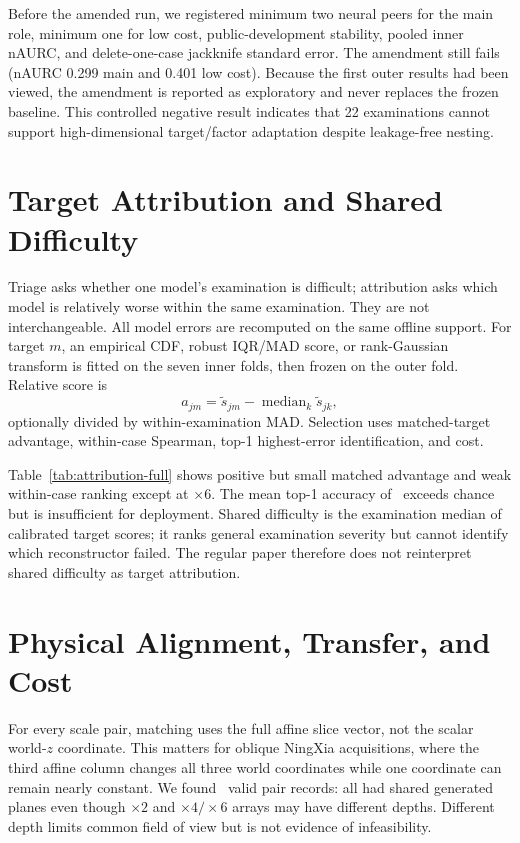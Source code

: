 \documentclass{article}
\begin{document}
Before the amended run, we registered minimum two neural peers for the main role, minimum one for low cost, public-development stability, pooled inner nAURC, and delete-one-case jackknife standard error. The amendment still fails (nAURC 0.299 main and 0.401 low cost). Because the first outer results had been viewed, the amendment is reported as exploratory and never replaces the frozen baseline. This controlled negative result indicates that 22 examinations cannot support high-dimensional target/factor adaptation despite leakage-free nesting.

\section{Target Attribution and Shared Difficulty}
Triage asks whether one model's examination is difficult; attribution asks which model is relatively worse within the same examination. They are not interchangeable. All model errors are recomputed on the same offline support. For target $m$, an empirical CDF, robust IQR/MAD score, or rank-Gaussian transform is fitted on the seven inner folds, then frozen on the outer fold. Relative score is
\begin{equation}
 a_{jm}=\widetilde s_{jm}-\operatorname{median}_{k}\widetilde s_{jk},
\end{equation}
optionally divided by within-examination MAD. Selection uses matched-target advantage, within-case Spearman, top-1 highest-error identification, and cost.

\begin{table}[!t]
 \centering
 \caption{Outer-fold attribution across all 11 neural targets. Chance top-1 accuracy is 9.1\%.}
 \resizebox{\columnwidth}{!}{}
 \label{tab:attribution-full}
\end{table}

Table~\ref{tab:attribution-full} shows positive but small matched advantage and weak within-case ranking except at $\times6$. The mean top-1 accuracy of \NestedAttrTop\ exceeds chance but is insufficient for deployment. Shared difficulty is the examination median of calibrated target scores; it ranks general examination severity but cannot identify which reconstructor failed. The regular paper therefore does not reinterpret shared difficulty as target attribution.

\section{Physical Alignment, Transfer, and Cost}
For every scale pair, matching uses the full affine slice vector, not the scalar world-$z$ coordinate. This matters for oblique NingXia acquisitions, where the third affine column changes all three world coordinates while one coordinate can remain nearly constant. We found \PhysicalMatchedRecords\ valid pair records: all had shared generated planes even though $\times2$ and $\times4/\times6$ arrays may have different depths. Different depth limits common field of view but is not evidence of infeasibility.
\end{document}
